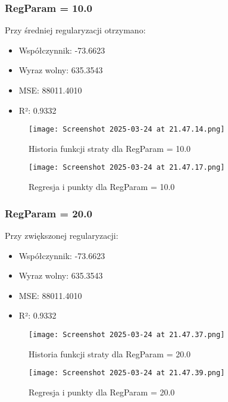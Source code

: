 \documentclass{article}
\begin{document}
\subsubsection{RegParam = 10.0}
Przy średniej regularyzacji otrzymano:
\begin{itemize}
    \item Współczynnik: -73.6623
    \item Wyraz wolny: 635.3543
    \item MSE: 88011.4010
    \item R²: 0.9332
\end{itemize}

\begin{figure}[H]
    \centering
    \begin{minipage}{0.45\textwidth}
        \texttt{[image: Screenshot 2025-03-24 at 21.47.14.png]}
        \caption{Historia funkcji straty dla RegParam = 10.0}
    \end{minipage}
    \hfill
    \begin{minipage}{0.45\textwidth}
        \texttt{[image: Screenshot 2025-03-24 at 21.47.17.png]}
        \caption{Regresja i punkty dla RegParam = 10.0}
    \end{minipage}
\end{figure}

\subsubsection{RegParam = 20.0}
Przy zwiększonej regularyzacji:
\begin{itemize}
    \item Współczynnik: -73.6623
    \item Wyraz wolny: 635.3543
    \item MSE: 88011.4010
    \item R²: 0.9332
\end{itemize}

\begin{figure}[H]
    \centering
    \begin{minipage}{0.45\textwidth}
        \texttt{[image: Screenshot 2025-03-24 at 21.47.37.png]}
        \caption{Historia funkcji straty dla RegParam = 20.0}
    \end{minipage}
    \hfill
    \begin{minipage}{0.45\textwidth}
        \texttt{[image: Screenshot 2025-03-24 at 21.47.39.png]}
        \caption{Regresja i punkty dla RegParam = 20.0}
    \end{minipage}
\end{figure}
\end{document}
